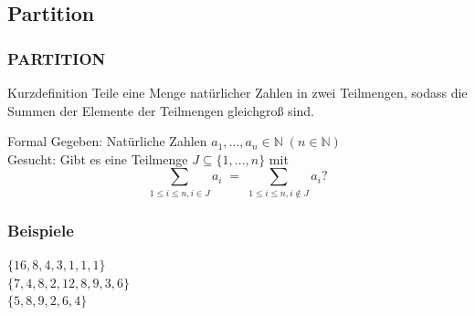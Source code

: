 \subsection{Partition}
\begin{frame}
	\frametitle{PARTITION}
	\begin{block}{Kurzdefinition}
	Teile eine Menge natürlicher Zahlen in zwei Teilmengen, sodass die Summen der Elemente der Teilmengen gleichgroß sind.
	\end{block}
	\begin{block}{Formal}
	Gegeben: Natürliche Zahlen $a_1,...,a_n \in \mathbb{N} \; (n \in 	\mathbb{N})$\\
	Gesucht: Gibt es eine Teilmenge $J \subseteq \{1,...,n\}$ mit\\
	\[\sum\limits_{1 \leq i \leq n, i \in J}a_i \; = \;
	\sum\limits_{1 \leq i \leq n, i \notin J}a_i \text{?}\]
	\end{block}
\end{frame}
\begin{frame}
	\frametitle{Beispiele}
	$\{16,8,4,3,1,1,1\}$\\
	$\{7,4,8,2,12,8,9,3,6\}$\\
	$\{5,8,9,2,6,4\}$
\end{frame}

